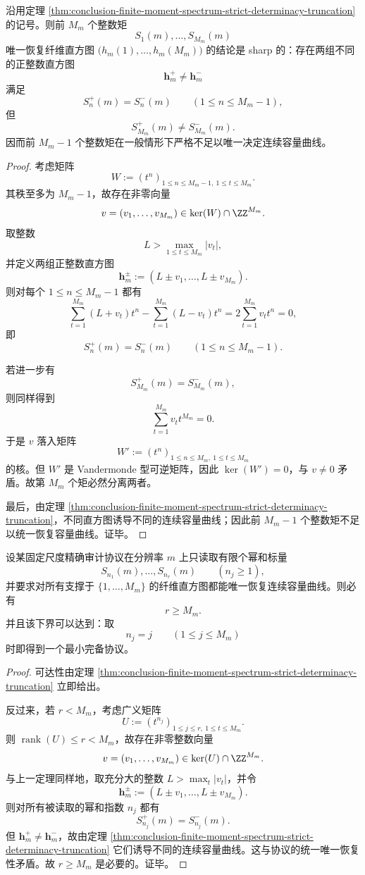 \begin{theorem}\label{thm:conclusion-finite-moment-truncation-sharp-threshold}
沿用定理 \ref{thm:conclusion-finite-moment-spectrum-strict-determinacy-truncation} 的记号。则前 \(M_m\) 个整数矩
\[
S_1(m),\dots,S_{M_m}(m)
\]
唯一恢复纤维直方图 \(\bigl(h_m(1),\dots,h_m(M_m)\bigr)\) 的结论是 sharp 的：存在两组不同的正整数直方图
\[
\mathbf h_m^+\neq \mathbf h_m^-
\]
满足
\[
S_n^+(m)=S_n^-(m)
\qquad(1\le n\le M_m-1),
\]
但
\[
S_{M_m}^+(m)\neq S_{M_m}^-(m).
\]
因而前 \(M_m-1\) 个整数矩在一般情形下严格不足以唯一决定连续容量曲线。
\end{theorem}
\begin{proof}
考虑矩阵
\[
W:=(t^n)_{1\le n\le M_m-1,\ 1\le t\le M_m}.
\]
其秩至多为 \(M_m-1\)，故存在非零向量
\[
v=(v_1,\dots,v_{M_m})\in \ker(W)\cap \ZZ^{M_m}.
\]
取整数
\[
L>\max_{1\le t\le M_m}|v_t|,
\]
并定义两组正整数直方图
\[
\mathbf h_m^{\pm}:=(L\pm v_1,\dots,L\pm v_{M_m}).
\]
则对每个 \(1\le n\le M_m-1\) 都有
\[
\sum_{t=1}^{M_m}(L+v_t)t^n
-
\sum_{t=1}^{M_m}(L-v_t)t^n
=
2\sum_{t=1}^{M_m}v_t t^n
=0,
\]
即
\[
S_n^+(m)=S_n^-(m)
\qquad(1\le n\le M_m-1).
\]

若进一步有
\[
S_{M_m}^+(m)=S_{M_m}^-(m),
\]
则同样得到
\[
\sum_{t=1}^{M_m}v_t t^{M_m}=0.
\]
于是 \(v\) 落入矩阵
\[
W':=(t^n)_{1\le n\le M_m,\ 1\le t\le M_m}
\]
的核。但 \(W'\) 是 Vandermonde 型可逆矩阵，因此 \(\ker(W')=0\)，与 \(v\neq 0\) 矛盾。故第 \(M_m\) 个矩必然分离两者。

最后，由定理 \ref{thm:conclusion-finite-moment-spectrum-strict-determinacy-truncation}，不同直方图诱导不同的连续容量曲线；因此前 \(M_m-1\) 个整数矩不足以统一恢复容量曲线。证毕。
\end{proof}

\begin{corollary}\label{cor:conclusion-finite-moment-audit-needs-exactly-Mm-scalars}
设某固定尺度精确审计协议在分辨率 \(m\) 上只读取有限个幂和标量
\[
S_{n_1}(m),\dots,S_{n_r}(m)
\qquad(n_j\ge 1),
\]
并要求对所有支撑于 \(\{1,\dots,M_m\}\) 的纤维直方图都能唯一恢复连续容量曲线。则必有
\[
r\ge M_m.
\]
并且该下界可以达到：取
\[
n_j=j
\qquad(1\le j\le M_m)
\]
时即得到一个最小完备协议。
\end{corollary}
\begin{proof}
可达性由定理 \ref{thm:conclusion-finite-moment-spectrum-strict-determinacy-truncation} 立即给出。

反过来，若 \(r<M_m\)，考虑广义矩阵
\[
U:=(t^{n_j})_{1\le j\le r,\ 1\le t\le M_m}.
\]
则 \(\operatorname{rank}(U)\le r<M_m\)，故存在非零整数向量
\[
v=(v_1,\dots,v_{M_m})\in \ker(U)\cap \ZZ^{M_m}.
\]
与上一定理同样地，取充分大的整数 \(L>\max_t|v_t|\)，并令
\[
\mathbf h_m^{\pm}:=(L\pm v_1,\dots,L\pm v_{M_m}).
\]
则对所有被读取的幂和指数 \(n_j\) 都有
\[
S_{n_j}^+(m)=S_{n_j}^-(m).
\]
但 \(\mathbf h_m^+\neq \mathbf h_m^-\)，故由定理 \ref{thm:conclusion-finite-moment-spectrum-strict-determinacy-truncation} 它们诱导不同的连续容量曲线。这与协议的统一唯一恢复性矛盾。故 \(r\ge M_m\) 是必要的。证毕。
\end{proof}

